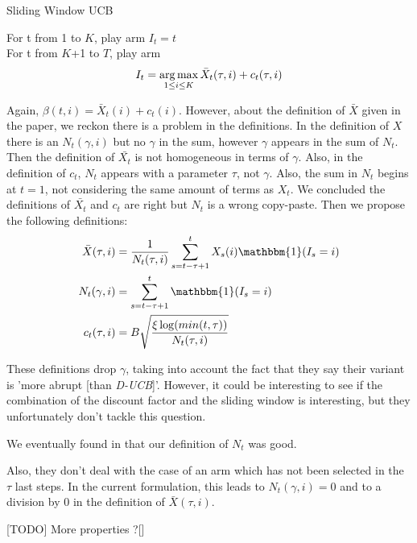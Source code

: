 \begin{algorithm}
    \caption{Sliding Window UCB}
    \label{alg:sw_ucb}
    For t from 1 to $K$, play arm $I_t = t$ \\
    For t from $K$+1 to $T$, play arm 
    $$ I_t = \operatorname*{arg\,max}_{1\leq i \leq K} \bar X_t(\tau,i) + c_t(\tau,i)$$
\end{algorithm}

Again, $\beta(t,i)=\bar{X}_t(i)+c_t(i)$.
However, about the definition of $\bar{X}$ given in the paper, we reckon there is a problem in the definitions. In the definition of $X$ there is an $N_t(\gamma, i)$ but no $\gamma$ in the sum, however $\gamma$ appears in the sum of $N_t$. Then the definition of $\bar{X_t}$ is not homogeneous in terms of $\gamma$. Also, in the definition of $c_t$, $N_t$ appears with a parameter $\tau$, not $\gamma$. Also, the sum in $N_t$ begins at $t=1$, not considering the same amount of terms as $X_t$. We concluded the definitions of $\bar{X_t}$ and $c_t$ are right but $N_t$ is a wrong copy-paste. Then we propose the following definitions:
\begin{align}
\bar{X}(\tau, i) &= \frac{1}{N_t(\tau, i)}\sum_{s=t-\tau+1}^t X_s(i)\mathbbm{1}(I_s=i) \\
N_t(\gamma, i) &= \sum_{s=t-\tau+1}^t \mathbbm{1}(I_s=i) \\
c_t(\tau, i) &= B\sqrt{\frac{\xi \log(min(t, \tau))}{N_t(\tau,i)}}
\end{align}

These definitions drop $\gamma$, taking into account the fact that they say their variant is 'more abrupt [than \textit{D-UCB}]'. However, it could be interesting to see if the combination of the discount factor and the sliding window is interesting, but they unfortunately don't tackle this question.

We eventually found in \cite{slidesGarivier} that our definition of $N_t$ was good.

Also, they don't deal with the case of an arm which has not been selected in the $\tau$ last steps. In the current formulation, this leads to $N_t(\gamma, i)=0$ and to a division by $0$ in the definition of $\bar{X}(\tau, i)$.

[TODO] More properties ?[]